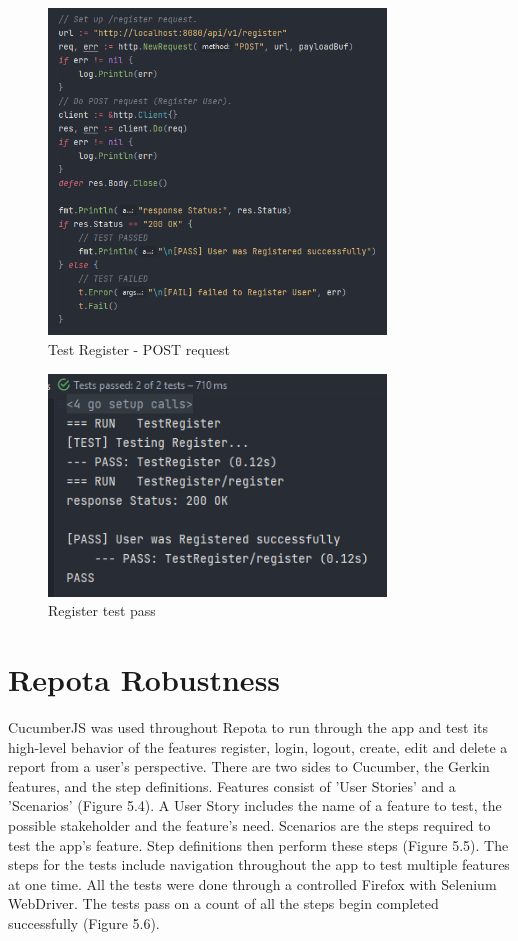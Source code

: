 \begin{figure}[H]
    \centering
    \caption{Test Register - POST request}
    \label{image:registerTestPostReq}
    \includegraphics[width=0.8\textwidth]{images/horton/tests/test_register_post.png}
\end{figure}

\begin{figure}[H]
    \centering
    \caption{Register test pass}
    \label{image:registerTestPass}
    \includegraphics[width=0.8\textwidth]{images/horton/tests/register_test_pass.png}
\end{figure}

\section{Repota Robustness}
CucumberJS was used throughout Repota to run through the app and test its high-level behavior of the features register, login, logout, create, edit and delete a report from a user's perspective. There are two sides to Cucumber, the Gerkin features, and the step definitions. Features consist of 'User Stories' and a 'Scenarios' (Figure 5.4). A User Story includes the name of a feature to test, the possible stakeholder and the feature's need. Scenarios are the steps required to test the app's feature. Step definitions then perform these steps (Figure 5.5). The steps for the tests include navigation throughout the app to test multiple features at one time. All the tests were done through a controlled Firefox with Selenium WebDriver. The tests pass on a count of all the steps begin completed successfully (Figure 5.6).

